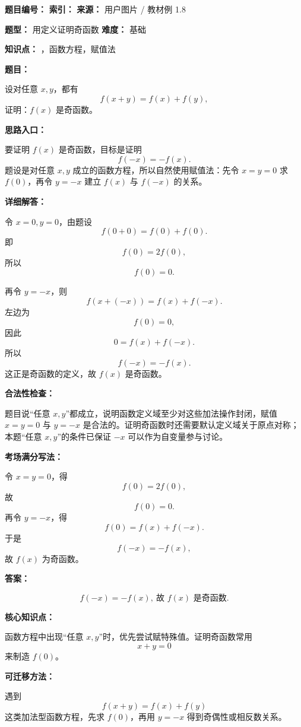 \begin{problemBox}
\begin{problemMeta}
\textbf{题目编号：}  \quad
\textbf{索引：}  \quad
\textbf{来源：} 用户图片 / 教材例 1.8

\textbf{题型：} 用定义证明奇函数 \quad
\textbf{难度：} 基础

\textbf{知识点：} ，函数方程，赋值法
\end{problemMeta}

\textbf{题目：}

设对任意 \(x,y\)，都有
\[
f(x+y)=f(x)+f(y),
\]
证明：\(f(x)\) 是奇函数。
\end{problemBox}

\begin{solutionBox}
\textbf{思路入口：}

要证明 \(f(x)\) 是奇函数，目标是证明
\[
f(-x)=-f(x).
\]
题设是对任意 \(x,y\) 成立的函数方程，所以自然使用赋值法：先令 \(x=y=0\) 求 \(f(0)\)，再令 \(y=-x\) 建立 \(f(x)\) 与 \(f(-x)\) 的关系。

\textbf{详细解答：}

令 \(x=0,y=0\)，由题设
\[
f(0+0)=f(0)+f(0).
\]
即
\[
f(0)=2f(0),
\]
所以
\[
f(0)=0.
\]

再令 \(y=-x\)，则
\[
f(x+(-x))=f(x)+f(-x).
\]
左边为
\[
f(0)=0,
\]
因此
\[
0=f(x)+f(-x).
\]
所以
\[
f(-x)=-f(x).
\]
这正是奇函数的定义，故 \(f(x)\) 是奇函数。

\textbf{合法性检查：}

题目说“任意 \(x,y\)”都成立，说明函数定义域至少对这些加法操作封闭，赋值 \(x=y=0\) 与 \(y=-x\) 是合法的。证明奇函数时还需要默认定义域关于原点对称；本题“任意 \(x,y\)”的条件已保证 \(-x\) 可以作为自变量参与讨论。

\textbf{考场满分写法：}

令 \(x=y=0\)，得
\[
f(0)=2f(0),
\]
故
\[
f(0)=0.
\]
再令 \(y=-x\)，得
\[
f(0)=f(x)+f(-x).
\]
于是
\[
f(-x)=-f(x),
\]
故 \(f(x)\) 为奇函数。

\textbf{答案：}

\[
\boxed{f(-x)=-f(x),\ \text{故 } f(x)\text{ 是奇函数}.}
\]
\end{solutionBox}

\begin{knowledgeBox}
\textbf{核心知识点：}

函数方程中出现“任意 \(x,y\)”时，优先尝试赋特殊值。证明奇函数常用
\[
x+y=0
\]
来制造 \(f(0)\)。

\textbf{可迁移方法：}

遇到
\[
f(x+y)=f(x)+f(y)
\]
这类加法型函数方程，先求 \(f(0)\)，再用 \(y=-x\) 得到奇偶性或相反数关系。
\end{knowledgeBox}

